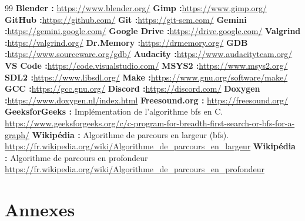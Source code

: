 \documentclass[11pt, a4paper]{article}
\begin{document}
    \begin{thebibliography}{99}
         \textbf{Blender :} \url{https://www.blender.org/}
        \textbf{Gimp :}\url{https://www.gimp.org/}
        \textbf{GitHub :}\url{https://github.com/}
        \textbf{Git :}\url{https://git-scm.com/}
        \textbf{Gemini :}\url{https://gemini.google.com/}
        \textbf{Google Drive :}\url{https://drive.google.com/}
        \textbf{Valgrind :}\url{https://valgrind.org/}
        \textbf{Dr.Memory :}\url{https://drmemory.org/}
        \textbf{GDB :}\url{https://www.sourceware.org/gdb/}
        \textbf{Audacity :}\url{https://www.audacityteam.org/}
        \textbf{VS Code :}\url{https://code.visualstudio.com/}
        \textbf{MSYS2 :}\url{https://www.msys2.org/}
        \textbf{SDL2 :}\url{https://www.libsdl.org/}
        \textbf{Make :}\url{https://www.gnu.org/software/make/}
        \textbf{GCC :}\url{https://gcc.gnu.org/}
        \textbf{Discord :}\url{https://discord.com/}
        \textbf{Doxygen :}\url{https://www.doxygen.nl/index.html}
         \textbf{Freesound.org :} \url{https://freesound.org/}
        \textbf{GeeksforGeeks :} Implémentation de l'algorithme \acrshort{bfs} en C.\\\url{https://www.geeksforgeeks.org/c/c-program-for-breadth-first-search-or-bfs-for-a-graph/}
        \textbf{Wikipédia :} Algorithme de parcours en largeur (\acrshort{bfs}).\\\url{https://fr.wikipedia.org/wiki/Algorithme_de_parcours_en_largeur}
        \textbf{Wikipédia :} Algorithme de parcours en profondeur\\\url{https://fr.wikipedia.org/wiki/Algorithme_de_parcours_en_profondeur}
    \end{thebibliography}
    \newpage
    \printglossary[type=\acronymtype]
    \printglossary
\newpage
\section{Annexes}
\end{document}
